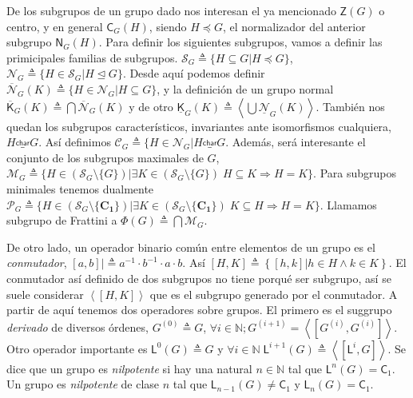 \documentclass[12pt,a4paper,fleqn,spanish,final,openright]{extbook}
\theoremstyle{definition}
\theoremstyle{remark}
\theoremstyle{proof}
\begin{document}
De los subgrupos de un grupo dado nos interesan el ya mencionado $\mathsf{Z}(G)$
o centro, y en general $\mathsf{C}_{G}(H)$, siendo $H     \preccurlyeq      G$,
el normalizador del anterior subgrupo $\mathsf{N}_{G}(H)$. Para definir
los siguientes subgrupos, vamos a definir las primicipales familias
de subgrupos. $\mathcal{S}_{G}\triangleq\lbrace H     \subseteq G|H     \preccurlyeq      G\rbrace$,
$\mathcal{N}_{G}\triangleq\lbrace H     \in \mathcal{S}_{G}|H\trianglelefteq G\rbrace$. Desde aquí podemos definir $\mathcal{\overline N}_{G}(K)\triangleq\lbrace H     \in \mathcal{N}_{G}|H  \subseteq G\rbrace$, y la definición de un grupo normal ${\overline{\mathsf{K}}}_{G}(K)\triangleq\bigcap\mathcal{\overline N}_{G}(K)$ y de otro ${\underline{\mathsf{K}}}_{G}(K)\triangleq\left\langle\bigcup\mathcal{\underline N}_{G}(K)\right\rangle$.
También nos quedan los subgrupos característicos, invariantes ante
isomorfismos cualquiera, $ H  \overset{\mathsf{{char}}}{\_} G $. Así definimos
$\mathcal{C}_{G}\triangleq\lbrace H    \in \mathcal{N}_{G} \vert H  \overset{\mathsf{{char}}}{\_} G$.
Además, será interesante el conjunto de los subgrupos maximales de $G$, $\mathcal{M}_{G} \triangleq
\lbrace H   \in \left({\mathcal{S}_{G}}\setminus \lbrace G\rbrace\right) \vert    \exists    K    \in \left({\mathcal{S}_{G}}\setminus \lbrace G\rbrace\right)\; H    \subseteq K   \Rightarrow    H=K\rbrace$. Para subgrupos minimales tenemos dualmente $\mathcal{P}_{G} \triangleq
\lbrace H   \in \left({\mathcal{S}_{G}}\setminus \lbrace \mathbf{C_1}\rbrace\right) \vert    \exists    K    \in \left({\mathcal{S}_{G}}\setminus \lbrace \mathbf{C_1}\rbrace\right)\; K    \subseteq H   \Rightarrow    H=K\rbrace$. Llamamos subgrupo de Frattini a $\Phi (G)\triangleq \bigcap \mathcal{M}_{G}$.

De otro lado, un operador binario común entre elementos de un grupo es el \emph{conmutador}, $\left[ a,b \right] |\triangleq a^{-1}  \cdot b^{-1}   \cdot a   \cdot b$. Así $\left[{H,K}\right]\triangleq \left\lbrace\left[ h,k \right] | h  \in H \wedge k  \in K\right\rbrace $. El conmutador así definido de dos subgrupos no tiene porqué ser subgrupo, así se suele considerar $\left\langle{\left[{H,K}\right]}\right\rangle$ que es el subgrupo generado por el conmutador. A partir de aquí tenemos dos operadores sobre grupos. El primero es el suggrupo \emph{derivado} de diversos órdenes, $G^{(0)}\triangleq G$, $\forall i  \in \mathds{N}; G^{(i+1)}=\left\langle\left[ G^{(i)},G^{(i)}\right]\right\rangle$. Otro operador importante es $\mathsf{L}^{0}(G)\triangleq G$ y $\forall i   \in \mathds{N}\;\mathsf{L}^{i+1}(G)\triangleq \left\langle\left[{ \mathsf{L}^{i} , G }\right]\right\rangle$. Se dice que un grupo es \emph{nilpotente} si hay una natural $n  \in \mathds{N}$ tal que $\mathsf{L}^{n}(G)=\mathsf{C}_{1}$. Un grupo es \emph{nilpotente} de clase $n$ tal que $\mathsf{L}_{n-1}(G)  \neq   \mathsf{C}_1$ y $\mathsf{L}_{n}(G)=\mathsf{C}_1$.
\end{document}
